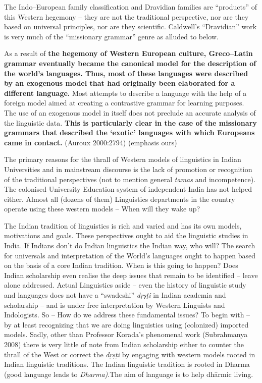 The Indo–European family classification and Dravidian families are “products” of this Western hegemony – they are not the traditional perspective, nor are they based on universal principles, nor are they scientific. Caldwell’s “Dravidian” work is very much of the “missionary grammar” genre as alluded to below.

\begin{myquote}
As a result of \textbf{the hegemony of Western European culture, Greco–Latin grammar eventually became the canonical model for the description of the world’s languages. Thus, most of these languages were described by an exogenous model that had originally been elaborated for a different language.} Most attempts to describe a language with the help of a foreign model aimed at creating a contrastive grammar for learning purposes. The use of an exogenous model in itself does not preclude an accurate analysis of the linguistic data. \textbf{This is particularly clear in the case of the missionary grammars that described the ‘exotic’ languages with which Europeans came in contact.} (Auroux 2000:2794) (emphasis ours)
\end{myquote}

The primary reasons for the thrall of Western models of linguistics in Indian Universities and in mainstream discourse is the lack of promotion or recognition of the traditional perspectives (not to mention general \textit{tamas} and incompetence). The colonised University Education system of independent India has not helped either. Almost all (dozens of them) Linguistics departments in the country operate using these western models – When will they wake up?

The Indian tradition of linguistics is rich and varied and has its own models, motivations and goals. These perspectives ought to aid the linguistic studies in India. If Indians don’t do Indian linguistics the Indian way, who will? The search for universals and interpretation of the World’s languages ought to happen based on the basis of a core Indian tradition. When is this going to happen? Does Indian scholarship even realise the deep issues that remain to be identified – leave alone addressed. Actual Linguistics aside – even the history of linguistic study and languages does not have a “swadeshi” \textit{dṛṣṭi} in Indian academia and scholarship – and is under free interpretation by Western Linguists and Indologists. So – How do we address these fundamental issues? To begin with – by at least recognizing that we are doing linguistics using (colonized) imported models. Sadly, other than Professor Korada’s phenomenal work (Subrahmanya 2008) there is very little of note from Indian scholarship either to counter the thrall of the West or correct the \textit{dṛṣṭi} by engaging with western models rooted in Indian linguistic traditions. The Indian linguistic tradition is rooted in Dharma (good language leads to \textit{Dharma)}.The aim of language is to help dhārmic living.

